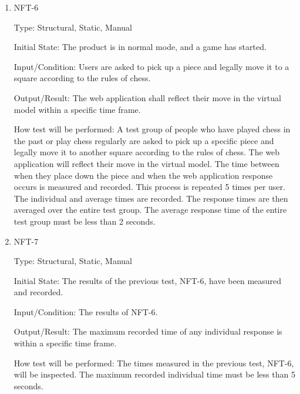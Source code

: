 \documentclass[12pt, titlepage]{article}
\begin{document}
\begin{enumerate}
    \item{NFT-6}

        Type: Structural, Static, Manual
                            
        Initial State: The product is in normal mode, and a game has started.
                            
        Input/Condition: Users are asked to pick up a piece and legally move it to a square according to the rules of chess.
                            
        Output/Result: The web application shall reflect their move in the virtual model within a specific time frame.
                            
        How test will be performed: A test group of people who have played chess in the past or play chess regularly are asked to pick up a specific piece and 
            legally move it to another square according to the rules of chess. The web application will reflect their move in the virtual model. The time between 
            when they place down the piece and when the web application response occurs is measured and recorded. This process is repeated 5 times per user. The 
            individual and average times are recorded. The response times are then averaged over the entire test group. The average response time of the entire
            test group must be less than 2 seconds.

    \item{NFT-7}

        Type: Structural, Static, Manual
                                
        Initial State: The results of the previous test, NFT-6, have been measured and recorded.
                            
        Input/Condition: The results of NFT-6.
                            
        Output/Result: The maximum recorded time of any individual response is within a specific time frame.
                            
        How test will be performed: The times measured in the previous test, NFT-6, will be inspected. The maximum recorded individual time must be less than 
            5 seconds.
\end{enumerate}
\end{document}
